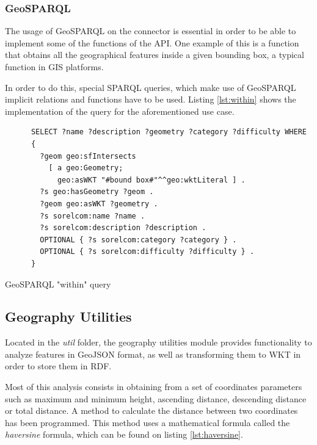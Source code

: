 \subsubsection*{GeoSPARQL}

The usage of GeoSPARQL on the connector is essential in order to be able to implement some of the functions of the API. One example of this is a function that obtains all the geographical features inside a given bounding box, a typical function in GIS platforms.

In order to do this, special SPARQL queries, which make use of GeoSPARQL implicit relations and functions have to be used. Listing \ref{lst:within} shows the implementation of the query for the aforementioned use case.

\begin{listing}[ht]\centering
  \begin{minipage}{.85\textwidth}
    \begin{verbatim}
      SELECT ?name ?description ?geometry ?category ?difficulty WHERE
      {
        ?geom geo:sfIntersects 
          [ a geo:Geometry; 
            geo:asWKT "#bound box#"^^geo:wktLiteral ] . 
        ?s geo:hasGeometry ?geom . 
        ?geom geo:asWKT ?geometry . 
        ?s sorelcom:name ?name . 
        ?s sorelcom:description ?description . 
        OPTIONAL { ?s sorelcom:category ?category } . 
        OPTIONAL { ?s sorelcom:difficulty ?difficulty } . 
      }
    \end{verbatim}
  \end{minipage}
  \caption{GeoSPARQL "within" query}\label{lst:within}
\end{listing}


\subsection{Geography Utilities}

Located in the \textit{util} folder, the geography utilities module provides functionality to analyze features in GeoJSON format, as well as transforming them to WKT in order to store them in RDF.

Most of this analysis consists in obtaining from a set of coordinates parameters such as maximum and minimum height, ascending distance, descending distance or total distance. A method to calculate the distance between two coordinates has been programmed. This method uses a mathematical formula called the \textit{haversine} formula, which can be found on listing \ref{lst:haversine}.

